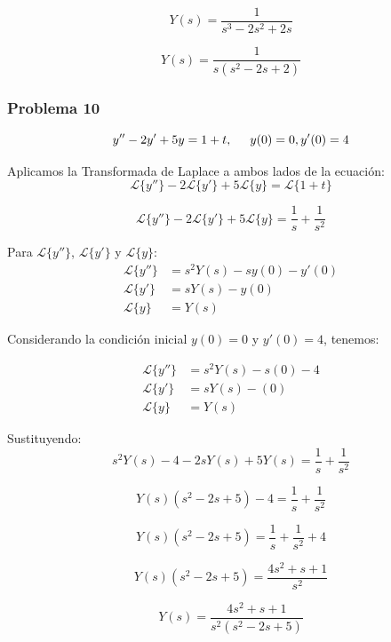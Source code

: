 \documentclass{article}
\begin{document}
\[
    Y(s) = \frac{1}{s^3 - 2s^2 + 2s}
\]

\[
    Y(s) = \frac{1}{s(s^2-2s+2)}
\]

\newpage


\subsubsection{Problema 10}
\[y'' - 2y' + 5y = 1 + t, \hspace{.5cm} y(0) = 0, y'(0) = 4\]

Aplicamos la Transformada de Laplace a ambos lados de la ecuación:
\[
    \mathcal{L}\{y''\} - 2\mathcal{L}\{y'\} + 5\mathcal{L}\{y\} = \mathcal{L}\{1 + t\}
\]

\[
    \mathcal{L}\{y''\} - 2\mathcal{L}\{y'\} + 5\mathcal{L}\{y\} = \frac{1}{s} + \frac{1}{s^2}
\]

Para \(\mathcal{L}\{y''\}\), \(\mathcal{L}\{y'\}\) y \(\mathcal{L}\{y\}\):
\begin{align*}
    \mathcal{L}\{y''\} & = s^2Y(s) - sy(0) - y'(0) \\
    \mathcal{L}\{y'\}  & = sY(s) - y(0)            \\
    \mathcal{L}\{y\}   & = Y(s)
\end{align*}

Considerando la condición inicial $y(0) = 0$ y $y'(0) = 4$, tenemos:

\begin{align*}
    \mathcal{L}\{y''\} & = s^2Y(s) - s(0) - 4 \\
    \mathcal{L}\{y'\}  & = sY(s) - (0)        \\
    \mathcal{L}\{y\}   & = Y(s)
\end{align*}

Sustituyendo:
\[
    s^2Y(s) - 4 - 2sY(s) + 5Y(s) = \frac{1}{s} + \frac{1}{s^2}
\]

\[
    Y(s)(s^2 - 2s + 5) - 4 = \frac{1}{s} + \frac{1}{s^2}
\]

\[
    Y(s)(s^2 - 2s + 5) = \frac{1}{s} + \frac{1}{s^2} + 4
\]

\[
    Y(s)(s^2 - 2s + 5) = \frac{4s^2+s+1}{s^2}
\]

\[
    Y(s) = \frac{4s^2+s+1}{s^2(s^2 - 2s + 5)}
\]
\end{document}
